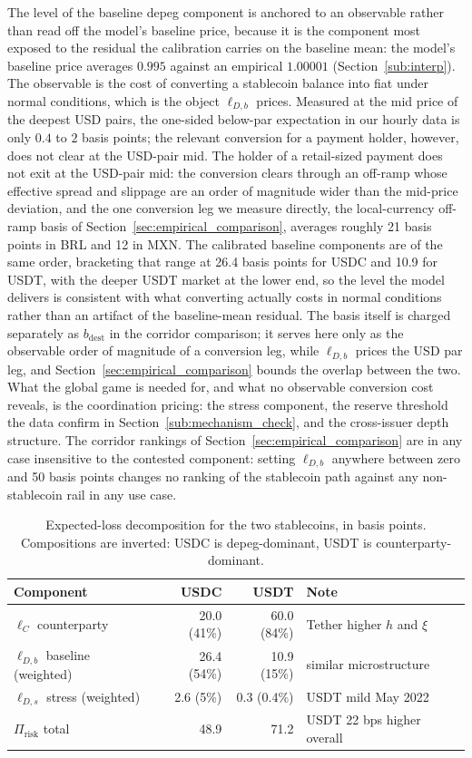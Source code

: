 The level of the baseline depeg component is anchored to an observable rather than read off the model's baseline price, because it is the component most exposed to the residual the calibration carries on the baseline mean: the model's baseline price averages $0.995$ against an empirical $1.00001$ (Section~\ref{sub:interp}). The observable is the cost of converting a stablecoin balance into fiat under normal conditions, which is the object $\ell_{D,b}$ prices. Measured at the mid price of the deepest USD pairs, the one-sided below-par expectation in our hourly data is only $0.4$ to $2$ basis points; the relevant conversion for a payment holder, however, does not clear at the USD-pair mid. The holder of a retail-sized payment does not exit at the USD-pair mid: the conversion clears through an off-ramp whose effective spread and slippage are an order of magnitude wider than the mid-price deviation, and the one conversion leg we measure directly, the local-currency off-ramp basis of Section~\ref{sec:empirical_comparison}, averages roughly 21 basis points in BRL and 12 in MXN. The calibrated baseline components are of the same order, bracketing that range at 26.4 basis points for USDC and 10.9 for USDT, with the deeper USDT market at the lower end, so the level the model delivers is consistent with what converting actually costs in normal conditions rather than an artifact of the baseline-mean residual. The basis itself is charged separately as $b_{\text{dest}}$ in the corridor comparison; it serves here only as the observable order of magnitude of a conversion leg, while $\ell_{D,b}$ prices the USD par leg, and Section~\ref{sec:empirical_comparison} bounds the overlap between the two. What the global game is needed for, and what no observable conversion cost reveals, is the coordination pricing: the stress component, the reserve threshold the data confirm in Section~\ref{sub:mechanism_check}, and the cross-issuer depth structure. The corridor rankings of Section~\ref{sec:empirical_comparison} are in any case insensitive to the contested component: setting $\ell_{D,b}$ anywhere between zero and 50 basis points changes no ranking of the stablecoin path against any non-stablecoin rail in any use case.

\begin{table}[H]
\centering
\caption{Expected-loss decomposition for the two stablecoins, in basis points. Compositions are inverted: USDC is depeg-dominant, USDT is counterparty-dominant.}\label{tab:dual_asset_premium}
\begin{tabular}{lrrl}
\toprule
Component & USDC & USDT & Note \\
\midrule
$\ell_C$ counterparty                 & 20.0 (41\%) & 60.0 (84\%) & Tether higher $h$ and $\xi$ \\
$\ell_{D,b}$ baseline (weighted)      & 26.4 (54\%) & 10.9 (15\%) & similar microstructure \\
$\ell_{D,s}$ stress (weighted)        & 2.6  (5\%)  & 0.3 (0.4\%) & USDT mild May 2022 \\
$\Pi_{\text{risk}}$ total             & 48.9        & 71.2        & USDT 22 bps higher overall \\
\bottomrule
\end{tabular}
\end{table}

